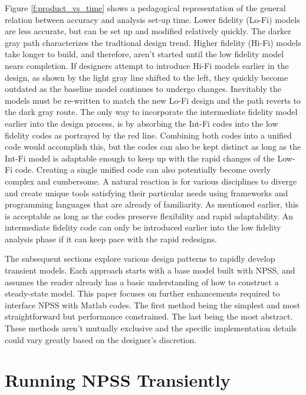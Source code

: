 \documentclass[heading.tex]{subfiles}
\begin{document}
Figure \ref{f:product_vs_time} shows a pedagogical representation of the general relation between accuracy and analysis set-up time. Lower fidelity (Lo-Fi) models are less accurate, but can be set up and modified relatively quickly. The darker gray path characterizes the tradtional design trend. Higher fidelity (Hi-Fi) models take longer to build, and therefore, aren't started until the low fidelity model nears completion. If designers attempt to introduce Hi-Fi models earlier in the design, as shown by the light gray line shifted to the left, they quickly become outdated as the baseline model continues to undergo changes. Inevitably the models must be re-written to match the new Lo-Fi design and the path reverts to the dark gray route. The only way to incorporate the intermediate fidelity model earlier into the design process, is by absorbing the Int-Fi codes into the low fidelity codes as portrayed by the red line. Combining both codes into a unified code would accomplish this, but the codes can also be kept distinct as long as the Int-Fi model is adaptable enough to keep up with the rapid changes of the Low-Fi code. Creating a single unified code can also potentially become overly complex and cumbersome. A natural reaction is for various disciplines to diverge and create unique tools satisfying their particular needs using frameworks and programming languages that are already of familiarity. As mentioned earlier, this is acceptable as long as the codes preserve flexibility and rapid adaptability. An intermediate fidelity code can only be introduced earlier into the low fidelity analysis phase if it can keep pace with the rapid redesigns.

The subsequent sections explore various design patterns to rapidly develop transient models. Each approach starts with a base model built with NPSS, and assumes the reader already has a basic understanding of how to construct a steady-state model. This paper focuses on further enhancements required to interface NPSS with Matlab codes. The first method being the simplest and most straightforward but performance constrained. The last being the most abstract. These methods aren't mutually exclusive and the specific implementation details could vary greatly based on the designer's discretion. 


\section{Running NPSS Transiently}


\begin{adjustwidth}{-1cm}{-1cm}
 \inputminted[]{c++}{code/transient1}
 \end{adjustwidth} 
\end{document}
